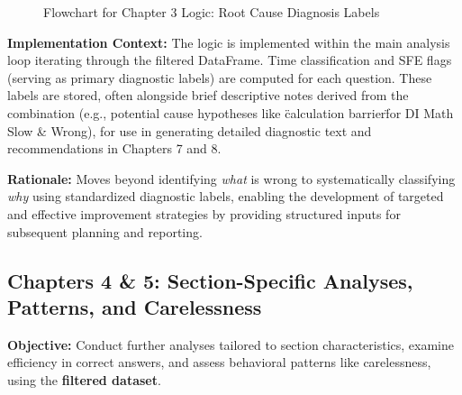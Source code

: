 \documentclass{article}
\begin{document}
\begin{figure}[htbp]
{
} %
\vspace{\baselineskip} %
\caption{Flowchart for Chapter 3 Logic: Root Cause Diagnosis Labels}
\label{fig:chapter3_logic}
\end{figure}

\textbf{Implementation Context:} The logic is implemented within the main analysis loop iterating through the filtered DataFrame. Time classification and SFE flags (serving as primary diagnostic labels) are computed for each question. These labels are stored, often alongside brief descriptive notes derived from the combination (e.g., potential cause hypotheses like \"calculation barrier\" for DI Math Slow \& Wrong), for use in generating detailed diagnostic text and recommendations in Chapters 7 and 8.

\textbf{Rationale:} Moves beyond identifying \textit{what} is wrong to systematically classifying \textit{why} using standardized diagnostic labels, enabling the development of targeted and effective improvement strategies by providing structured inputs for subsequent planning and reporting.

\subsection{Chapters 4 \& 5: Section-Specific Analyses, Patterns, and Carelessness}

\textbf{Objective:} Conduct further analyses tailored to section characteristics, examine efficiency in correct answers, and assess behavioral patterns like carelessness, using the \textbf{filtered dataset}.
\end{document}
